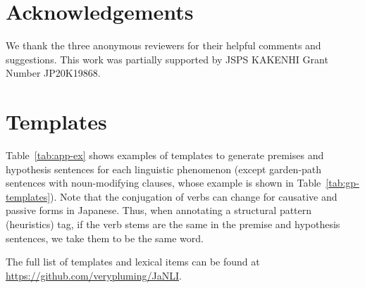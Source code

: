\documentclass[11pt]{article}
\begin{document}
\section*{Acknowledgements}
We thank the three anonymous reviewers for their helpful comments and suggestions.
This work was partially supported by JSPS KAKENHI Grant Number JP20K19868.




\appendix

\section{Templates}
\label{app:templates}



Table~\ref{tab:app-ex} shows examples of templates to generate
premises and hypothesis sentences for each linguistic phenomenon
(except garden-path sentences with noun-modifying clauses, whose
example is shown in Table~\ref{tab:gp-templates}).
Note that the conjugation of verbs can change for causative and passive forms in Japanese. Thus, when annotating a structural pattern (heuristics) tag,
if the verb stems are the same in the premise and hypothesis sentences,
we take them to be the same word.

The full list of templates and lexical items can be found at
 \url{https://github.com/verypluming/JaNLI}.
\end{document}
